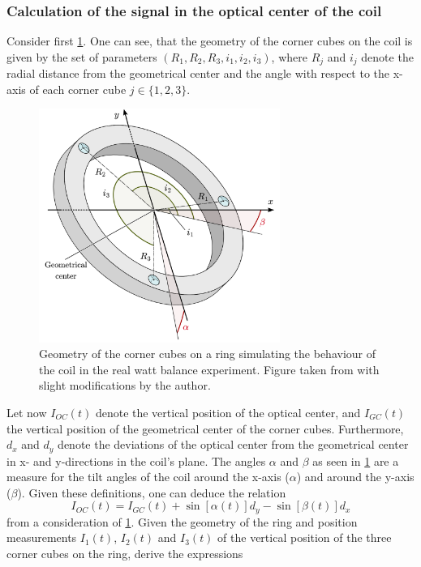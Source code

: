 \documentclass{report}
\numberwithin{tm}{section}
\begin{document}
\subsubsection{Calculation of the signal in the optical center of the coil}
Consider first \cref{fig:ring}. One can see, that the geometry of the corner cubes on the coil is given by the set of parameters $(R_1, R_2, R_3, i_1, i_2, i_3)$, where $R_j$ and $i_j$ denote the radial distance from the geometrical center and the angle with respect to the x-axis of each corner cube $j\in\{1,2,3\}$.
\begin{figure}[h]
	\centering
	\includegraphics[width=0.7\textwidth]{figures/ring.png}
	\caption{Geometry of the corner cubes on a ring simulating the behaviour of the coil in the real watt balance experiment. Figure taken from \cite[p.11]{Glardon.2024} with slight modifications by the author.}
	\label{fig:ring}
\end{figure}
Let now $I_{OC}(t)$ denote the vertical position of the optical center, and $I_{GC}(t)$ the vertical position of the geometrical center of the corner cubes. Furthermore, $d_x$ and $d_y$ denote the deviations of the optical center from the geometrical center in x- and y-directions in the coil's plane. The angles $\alpha$ and $\beta$ as seen in \cref{fig:ring} are a measure for the tilt angles of the coil around the x-axis ($\alpha$) and around the y-axis ($\beta$). Given these definitions, one can deduce the relation \begin{equation}
	I_{OC}(t) = I_{GC}(t) + \sin[\alpha(t)]d_y - \sin[\beta(t)]d_x
\end{equation} from a consideration of \cref{fig:ring}. Given the geometry of the ring and position measurements $I_1(t)$, $I_2(t)$ and $I_3(t)$ of the vertical position of the three corner cubes on the ring, \cite{5544638} derive the expressions 
\end{document}
